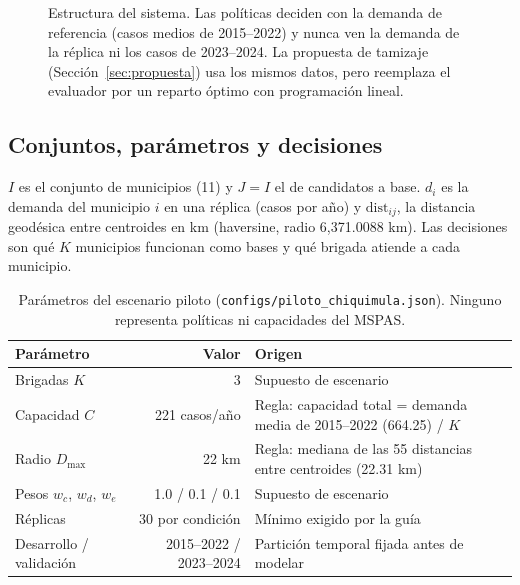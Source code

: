 \documentclass[11pt,letterpaper]{article}
\newcommand{\cod}[1]{\texttt{#1}}
\begin{document}
\begin{figure}[htbp]
\caption{Estructura del sistema. Las políticas deciden con la demanda de referencia (casos medios de 2015--2022) y nunca ven la demanda de la réplica ni los casos de 2023--2024. La propuesta de tamizaje (Sección~\ref{sec:propuesta}) usa los mismos datos, pero reemplaza el evaluador por un reparto óptimo con programación lineal.}
\label{fig:sistema}
\end{figure}

\subsection{Conjuntos, parámetros y decisiones}

$I$ es el conjunto de municipios (11) y $J=I$ el de candidatos a base. $d_i$ es la demanda del municipio $i$ en una réplica (casos por año) y $\mathrm{dist}_{ij}$, la distancia geodésica entre centroides en km (haversine, radio 6{,}371.0088 km). Las decisiones son qué $K$ municipios funcionan como bases y qué brigada atiende a cada municipio.

\begin{table}[htbp]
\centering
\small
\begin{tabularx}{\textwidth}{lrL}
\toprule
Parámetro & Valor & Origen \\
\midrule
Brigadas $K$ & 3 & Supuesto de escenario \\
Capacidad $C$ & 221 casos/año & Regla: capacidad total = demanda media de 2015--2022 (664.25) / $K$ \\
Radio $D_{\max}$ & 22 km & Regla: mediana de las 55 distancias entre centroides (22.31 km) \\
Pesos $w_c$, $w_d$, $w_e$ & 1.0 / 0.1 / 0.1 & Supuesto de escenario \\
Réplicas & 30 por condición & Mínimo exigido por la guía \\
Desarrollo / validación & 2015--2022 / 2023--2024 & Partición temporal fijada antes de modelar \\
\bottomrule
\end{tabularx}
\caption{Parámetros del escenario piloto (\cod{configs/piloto\_chiquimula.json}). Ninguno representa políticas ni capacidades del MSPAS.}
\label{tab:parametros}
\end{table}
\end{document}

